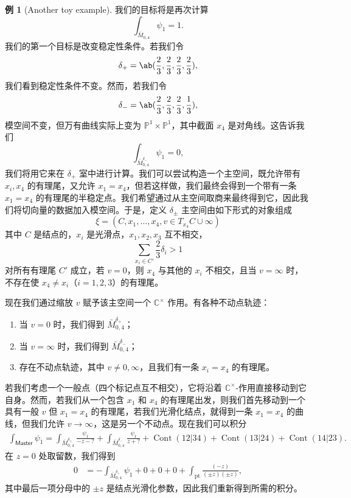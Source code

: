 \documentclass{amsart}
\theoremstyle{definition}
\newtheorem{exm}[thm]{例}
\theoremstyle{remark}
\theoremstyle{plain}
\theoremstyle{definition}
\theoremstyle{remark}
\newcommand{\C}{\mathbb{C}}
\renewcommand{\P}{\mathbb{P}}
\newcommand{\mr}[1]{\mathrm{#1}}
\newcommand{\on}[1]{\operatorname{#1}}
\newcommand{\ms}[1]{\mathsf{#1}}
\newcommand{\1}{\mathbf{1}}
\newcommand{\2}{\mathbf{2}}
\newcommand{\3}{\mathbf{3}}
\begin{document}
\begin{exm}[Another toy example]
    我们的目标将是再次计算
    \[ \int_{\bar{M}_{0,4}} \psi_1 = 1. \]
    我们的第一个目标是改变稳定性条件。若我们令
    \[ \delta_+ = \ab(\frac{2}{3}, \frac{2}{3}, \frac{2}{3}, \frac{2}{3}), \]
    我们看到稳定性条件不变。然而，若我们令
    \[ \delta_- = \ab(\frac{2}{3}, \frac{2}{3}, \frac{2}{3}, \frac{1}{3}), \]
    模空间不变，但万有曲线实际上变为 \(\P^1 \times \P^1\)，其中截面 \(x_4\) 是对角线。这告诉我们
    \[ \int_{\bar{M}_{0,4}^{\delta_-}} \psi_1 = 0, \]
    我们将用它来在 \(\delta_+\) 室中进行计算。我们可以尝试构造一个主空间，既允许带有 \(x_i, x_4\) 的有理尾，又允许 \(x_1 = x_4\)，但若这样做，我们最终会得到一个带有一条 \(x_1 = x_4\) 的有理尾的半稳定点。我们希望通过从主空间取商来最终得到它，因此我们将切向量的数据加入模空间。于是，定义 \(\delta_{\pm}\) 主空间由如下形式的对象组成
    \[ \xi = (C, x_1, \ldots, x_4, v \in T_{x_4} C \cup \infty) \]
    其中 \(C\) 是结点的，\(x_i\) 是光滑点，\(x_1, x_2, x_3\) 互不相交，
    \[ \sum_{x_i \in C'} \frac{2}{3} \delta_i > 1 \]
    对所有有理尾 \(C'\) 成立，若 \(v = 0\)，则 \(x_4\) 与其他的 \(x_i\) 不相交，且当 \(v = \infty\) 时，不存在使 \(x_4 \neq x_i\)（\(i = 1,2,3\)）的有理尾。

    现在我们通过缩放 \(v\) 赋予该主空间一个 \(\C^{\times}\) 作用。有各种不动点轨迹：
    \begin{enumerate}
        \item 当 \(v = 0\) 时，我们得到 \(\bar{M}_{0,4}^{\delta_+}\)；
        \item 当 \(v = \infty\) 时，我们得到 \(\bar{M}_{0,4}^{\delta_-}\)；
        \item 存在不动点轨迹，其中 \(v \neq 0,\infty\)，且我们有一条 \(x_i = x_4\) 的有理尾。
    \end{enumerate}

    若我们考虑一个一般点（四个标记点互不相交），它将沿着 \(\C^{\times}\)-作用直接移动到它自身。然而，若我们从一个包含 \(x_1\) 和 \(x_4\) 的有理尾出发，则我们首先移动到一个具有一般 \(v\) 但 \(x_1 = x_4\) 的有理尾，若我们光滑化结点，就得到一条 \(x_1 = x_4\) 的曲线，但我们允许 \(v \to \infty\)，这是另一个不动点。现在我们可以积分
    \begin{align*}
        \int_{\ms{Master}} \psi_1 = \int_{\bar{M}_{0,4}^{\delta_+}} \frac{\psi_1}{-z-?} + \int_{\bar{M}_{0,4}^{\delta_-}} \frac{\psi_1}{z+?} + \on{Cont}(12|34) + \on{Cont}(13|24) + \on{Cont}(14|23).
    \end{align*}
    在 \(z = 0\) 处取留数，我们得到
    \begin{align*}
        0 &= - \int_{\bar{M}_{0,4}^{\delta_+}} \psi_1 + 0 + 0 + 0 + \int_{\mr{pt}} \frac{(-z)}{(\pm z)(\pm z)},
    \end{align*}
    其中最后一项分母中的 \(\pm z\) 是结点光滑化参数，因此我们重新得到所需的积分。
\end{exm}
\end{document}
